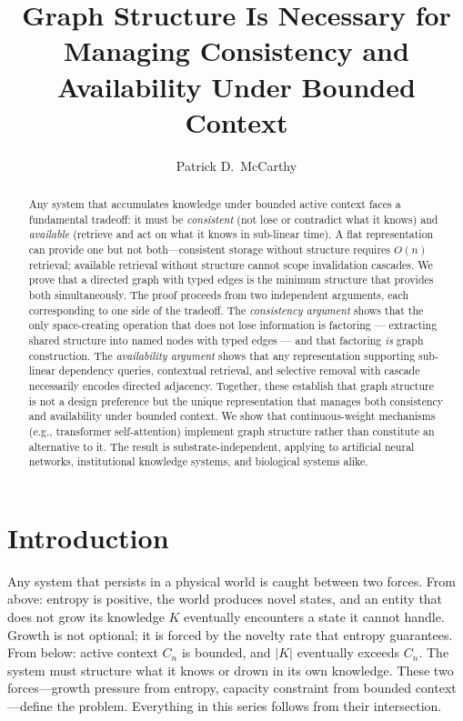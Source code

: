 \documentclass[11pt]{article}
\title{Graph Structure Is Necessary for\\Managing Consistency and Availability Under Bounded Context}
\author{Patrick D.\ McCarthy}
\date{}
\theoremstyle{definition}
\begin{document}
\maketitle

\begin{abstract}
Any system that accumulates knowledge under bounded active context
faces a fundamental tradeoff: it must be \emph{consistent}
(not lose or contradict what it knows) and \emph{available}
(retrieve and act on what it knows in sub-linear time). A flat
representation can provide one but not both---consistent storage
without structure requires $O(n)$ retrieval; available retrieval
without structure cannot scope invalidation cascades.
We prove that a directed graph with typed edges is the minimum
structure that provides both simultaneously. The proof proceeds
from two independent arguments, each corresponding to one side of
the tradeoff. The \emph{consistency argument} shows that the only
space-creating operation that does not lose information is factoring
--- extracting shared structure into named nodes with typed edges ---
and that factoring \emph{is} graph construction. The
\emph{availability argument} shows that any representation supporting
sub-linear dependency queries, contextual retrieval, and selective
removal with cascade necessarily encodes directed adjacency.
Together, these establish that graph structure is not a design
preference but the unique representation that manages both
consistency and availability under bounded context.
We show that continuous-weight mechanisms (e.g., transformer
self-attention) implement graph structure rather than constitute an
alternative to it. The result is substrate-independent, applying
to artificial neural networks, institutional knowledge systems, and
biological systems alike.
\end{abstract}

\section{Introduction}
\label{sec:intro}

Any system that persists in a physical world is caught between two
forces. From above: entropy is positive, the world produces novel
states, and an entity that does not grow its knowledge $K$ eventually
encounters a state it cannot handle. Growth is not optional; it is
forced by the novelty rate that entropy guarantees. From below:
active context $C_n$ is bounded, and $|K|$ eventually exceeds $C_n$.
The system must structure what it knows or drown in its own
knowledge. These two forces---growth pressure from entropy, capacity
constraint from bounded context---define the problem. Everything in
this series follows from their intersection.
\end{document}
